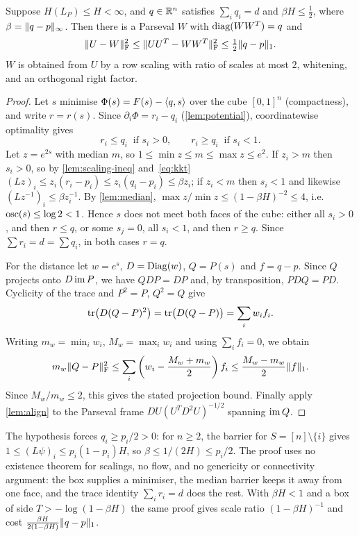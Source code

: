 \begin{theorem}\label{thm:balancing}
Suppose $H(L_P)\le H<\infty$, and $q\in\mathbb R^n$ satisfies $\sum_iq_i=d$ and
$\beta H\le\frac12$, where $\beta=\lVert q-p\rVert_\infty$. Then
there is a Parseval $W$ with $\operatorname{diag}(WW^T)=q$ and
\[
 \lVert U-W\rVert_{\mathrm F}^2\le\lVert UU^T-WW^T\rVert_{\mathrm F}^2\le\tfrac12\lVert q-p\rVert_1 .
\]
$W$ is obtained from $U$ by a row scaling with ratio of scales at most $2$,
whitening, and an orthogonal right factor.
\end{theorem}

\begin{proof}
Let $s$ minimise $\Phi(s)=F(s)-\langle q,s\rangle$ over the cube $[0,1]^n$ (compactness),
and write $r=r(s)$. Since $\partial_i\Phi=r_i-q_i$ (\cref{lem:potential}),
coordinatewise optimality gives
\begin{equation}\label{eq:kkt}
 r_i\le q_i\ \text{ if }s_i>0,\qquad r_i\ge q_i\ \text{ if }s_i<1 .
\end{equation}
Let $z=e^{2s}$ with median $m$, so $1\le\min z\le m\le\max z\le e^{2}$. If
$z_i>m$ then $s_i>0$, so by \cref{lem:scaling-ineq} and~\eqref{eq:kkt}
$(Lz)_i\le z_i(r_i-p_i)\le z_i(q_i-p_i)\le\beta z_i$; if $z_i<m$ then $s_i<1$
and likewise $(Lz^{-1})_i\le\beta z_i^{-1}$. By \cref{lem:median},
$\max z/\min z\le(1-\beta H)^{-2}\le4$, i.e.\ $\operatorname{osc}(s)\le\log2<1$. Hence
$s$ does not meet both faces of the cube: either all $s_i>0$, and then
$r\le q$, or some $s_j=0$, all $s_i<1$, and then $r\ge q$. Since
$\sum r_i=d=\sum q_i$, in both cases $r=q$.

For the distance let $w=e^s$, $D=\operatorname{Diag}(w)$, $Q=P(s)$ and $f=q-p$.
Since $Q$ projects onto $D\operatorname{im} P$, we have $QDP=DP$ and, by transposition,
$PDQ=PD$. Cyclicity of the trace and $P^2=P$, $Q^2=Q$ give
\[
 \operatorname{tr}\bigl(D(Q-P)^2\bigr)=\operatorname{tr}\bigl(D(Q-P)\bigr)=\sum_iw_if_i.
\]
Writing $m_w=\min_iw_i$, $M_w=\max_iw_i$ and using $\sum_if_i=0$, we obtain
\[
 m_w\lVert Q-P\rVert_{\mathrm F}^2\le\sum_i\left(w_i-\frac{M_w+m_w}{2}\right)f_i
 \le\frac{M_w-m_w}{2}\lVert f\rVert_1.
\]
Since $M_w/m_w\le2$, this gives the stated projection bound. Finally apply
\cref{lem:align} to the Parseval frame $DU(U^TD^2U)^{-1/2}$ spanning $\operatorname{im} Q$.
\end{proof}

\begin{remark}
The hypothesis forces $q_i\ge p_i/2>0$: for $n\ge2$, the barrier for
$S=[n]\setminus\{i\}$ gives $1\le(L\psi)_i\le p_i(1-p_i)H$, so
$\beta\le1/(2H)\le p_i/2$. The proof uses no existence theorem for scalings,
no flow, and no genericity or connectivity argument: the box supplies a
minimiser, the median barrier keeps it away from one face, and the trace
identity $\sum_ir_i=d$ does the rest. With
$\beta H<1$ and a box of side $T>-\log(1-\beta H)$ the same proof gives scale
ratio $(1-\beta H)^{-1}$ and cost
$\frac{\beta H}{2(1-\beta H)}\lVert q-p\rVert_1$.
\end{remark}

